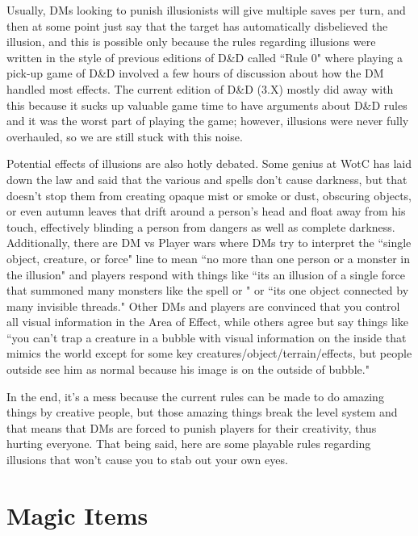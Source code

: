 Usually, DMs looking to punish illusionists will give multiple saves per turn, and then at some point just say that the target has automatically disbelieved the illusion, and this is possible only because the rules regarding illusions were written in the style of previous editions of D\&D called ``Rule 0" where playing a pick-up game of D\&D involved a few hours of discussion about how the DM handled most effects. The current edition of D\&D (3.X) mostly did away with this because it sucks up valuable game time to have arguments about D\&D rules and it was the worst part of playing the game; however, illusions were never fully overhauled, so we are still stuck with this noise.

Potential effects of illusions are also hotly debated. Some genius at WotC has laid down the law and said that the various  and  spells don't cause darkness, but that doesn't stop them from creating opaque mist or smoke or dust, obscuring objects, or even autumn leaves that drift around a person's head and float away from his touch, effectively blinding a person from dangers as well as complete darkness. Additionally, there are DM vs Player wars where DMs try to interpret the ``single object, creature, or force" line to mean ``no more than one person or a monster in the illusion" and players respond with things like ``its an illusion of a single force that summoned many monsters like the spell  or " or ``its one object connected by many invisible threads." Other DMs and players are convinced that you control all visual information in the Area of Effect, while others agree but say things like ``you can't trap a creature in a bubble with visual information on the inside that mimics the world except for some key creatures/object/terrain/effects, but people outside see him as normal because his image is on the outside of bubble."

In the end, it's a mess because the current rules can be made to do amazing things by creative people, but those amazing things break the level system and that means that DMs are forced to punish players for their creativity, thus hurting everyone. That being said, here are some playable rules regarding illusions that won't cause you to stab out your own eyes.

\section{Magic Items}
\vspace*{-8pt}

